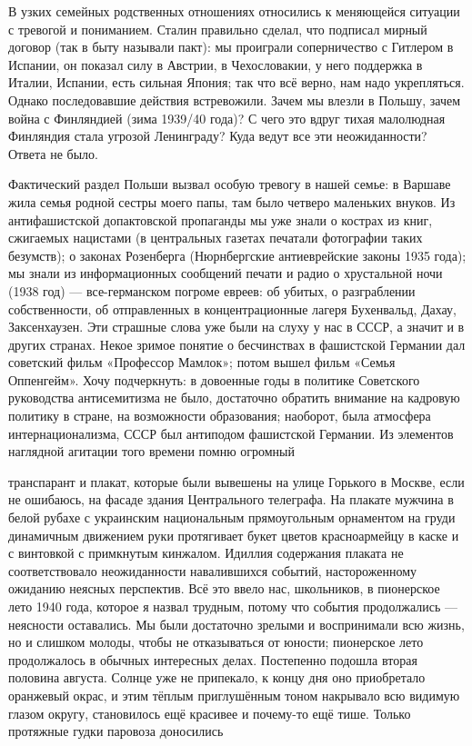 \label{22-2}
В узких семейных родственных отношениях относились к меняющейся ситуации с тревогой и пониманием. %
Сталин правильно сделал, что подписал мирный договор (так в быту называли пакт): мы проиграли соперничество с Гитлером в Испании, он показал силу в Австрии, в Чехословакии, у него поддержка в Италии, Испании, есть сильная Япония; так что всё верно, нам надо укрепляться. Однако последовавшие действия встревожили. Зачем мы влезли в Польшу, зачем война с Финляндией (зима 1939/40 года)? %
С чего это вдруг тихая малолюдная Финляндия стала угрозой Ленинграду? Куда ведут все эти неожиданности? Ответа не было.

\label{23-1}
Фактический раздел Польши вызвал особую тревогу в нашей семье: в Варшаве жила семья родной сестры моего папы, там было четверо маленьких внуков. Из антифашистской допактовской пропаганды мы уже знали о кострах из книг, сжигаемых нацистами (в центральных газетах печатали фотографии таких безумств); о законах Розенберга (Нюрнбергские антиеврейские законы 1935 года); мы знали из информационных сообщений печати и радио о хрустальной ночи (1938 год) — все-германском погроме евреев: об убитых, о разграблении собственности, об отправленных в концентрационные лагеря Бухенвальд, Дахау, Заксенхаузен. Эти страшные слова уже были на слуху у нас в СССР, а значит и в других странах. Некое зримое понятие о бесчинствах в фашистской Германии дал советский фильм «Профессор Мамлок»; потом вышел фильм «Семья Оппенгейм». Хочу подчеркнуть: в довоенные годы в политике Советского руководства антисемитизма не было, достаточно обратить внимание на кадровую политику в стране, на возможности образования; наоборот, была атмосфера интернационализма, СССР был антиподом фашистской Германии. Из элементов наглядной агитации того времени помню огромный

\label{24-1}
транспарант и плакат, которые были вывешены на улице Горького в Москве, если не ошибаюсь, на фасаде здания Центрального телеграфа. На плакате мужчина в белой рубахе с украинским национальным прямоугольным орнаментом на груди динамичным движением руки протягивает букет цветов красноармейцу в каске и с винтовкой с примкнутым кинжалом. Идиллия содержания плаката не соответствовало неожиданности навалившихся событий, настороженному ожиданию неясных перспектив. Всё это ввело нас, школьников, в пионерское лето 1940 года, которое я назвал трудным, потому что события продолжались — неясности оставались. Мы были достаточно зрелыми и воспринимали всю жизнь, но и слишком молоды, чтобы не отказываться от юности; пионерское лето продолжалось в обычных интересных делах. Постепенно подошла вторая половина августа. Солнце уже не припекало, к концу дня оно приобретало оранжевый окрас, и этим тёплым приглушённым тоном накрывало всю видимую глазом округу, становилось ещё красивее и почему-то ещё тише. Только протяжные гудки паровоза доносились 

